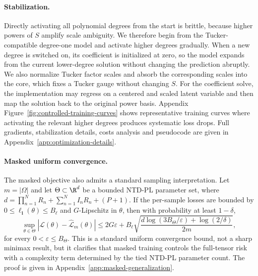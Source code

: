\paragraph{Stabilization.}
Directly activating all polynomial degrees from the start is brittle, because
higher powers of \(S\) amplify scale ambiguity. We therefore begin from the
Tucker-compatible degree-one model and activate higher degrees gradually. When
a new degree is switched on, its coefficient is initialized at zero, so the
model expands from the current lower-degree solution without changing the
prediction abruptly. We also normalize Tucker factor scales and absorb the
corresponding scales into the core, which fixes a Tucker gauge without
changing \(S\). For the coefficient solve, the implementation may regress on a
centered and scaled latent variable and then map the solution back to the
original power basis. Appendix Figure~\ref{fig:controlled-training-curves}
shows representative training curves where activating the relevant higher
degrees produces systematic loss drops. Full gradients, stabilization details, costs analysis and pseudocode are given in Appendix~\ref{app:optimization-details}.

\paragraph{Masked uniform convergence.}
The masked objective also admits a standard sampling interpretation. Let
\(m=|\Omega|\) and let \(\Theta\subset\R^d\) be a bounded NTD-PL parameter
set, where \(d=\prod_{n=1}^{N}R_n+\sum_{n=1}^{N}I_nR_n+(P+1)\). If the
per-sample losses are bounded by \(0\le \ell_{\mathbf i}(\theta)\le B_\ell\)
and \(G\)-Lipschitz in \(\theta\), then with probability at least \(1-\delta\),
\begin{equation}
  \sup_{\theta\in\Theta}
  \left|
  \mathcal L(\theta)-\widehat{\mathcal L}_{m}(\theta)
  \right|
  \le
  2G\varepsilon
  +
  B_\ell
  \sqrt{
  \frac{
  d\log(3B_\Theta/\varepsilon)+\log(2/\delta)}
  {2m}},
\end{equation}
for every \(0<\varepsilon\le B_\Theta\). This is a standard uniform
convergence bound, not a sharp minimax result, but it clarifies that masked
training controls the full-tensor risk with a complexity term determined by the
tied NTD-PL parameter count. The proof is given in
Appendix~\ref{app:masked-generalization}.
